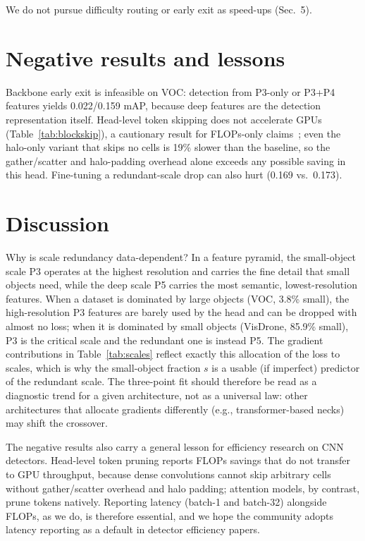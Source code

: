 \documentclass[times,twocolumn,final,authoryear]{elsarticle}
\begin{document}
We do not pursue difficulty routing or early exit as speed-ups (Sec.~5).

\section{Negative results and lessons}
Backbone early exit is infeasible on VOC: detection from P3-only or P3+P4 features yields 0.022/0.159 mAP, because deep features are the detection representation itself. Head-level token skipping does not accelerate GPUs (Table~\ref{tab:blockskip}), a cautionary result for FLOPs-only claims~\cite{rao2021dynamicvit,liang2022evit}; even the halo-only variant that skips no cells is 19\% slower than the baseline, so the gather/scatter and halo-padding overhead alone exceeds any possible saving in this head. Fine-tuning a redundant-scale drop can also hurt (0.169 vs.\ 0.173).

\section{Discussion}
Why is scale redundancy data-dependent? In a feature pyramid, the small-object scale P3 operates at the highest resolution and carries the fine detail that small objects need, while the deep scale P5 carries the most semantic, lowest-resolution features. When a dataset is dominated by large objects (VOC, 3.8\% small), the high-resolution P3 features are barely used by the head and can be dropped with almost no loss; when it is dominated by small objects (VisDrone, 85.9\% small), P3 is the critical scale and the redundant one is instead P5. The gradient contributions in Table~\ref{tab:scales} reflect exactly this allocation of the loss to scales, which is why the small-object fraction $s$ is a usable (if imperfect) predictor of the redundant scale. The three-point fit should therefore be read as a diagnostic trend for a given architecture, not as a universal law: other architectures that allocate gradients differently (e.g., transformer-based necks) may shift the crossover.

The negative results also carry a general lesson for efficiency research on CNN detectors. Head-level token pruning reports FLOPs savings that do not transfer to GPU throughput, because dense convolutions cannot skip arbitrary cells without gather/scatter overhead and halo padding; attention models, by contrast, prune tokens natively. Reporting latency (batch-1 and batch-32) alongside FLOPs, as we do, is therefore essential, and we hope the community adopts latency reporting as a default in detector efficiency papers.
\end{document}
